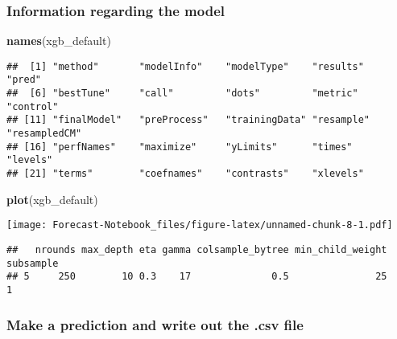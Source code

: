 \documentclass[]{article}
\newenvironment{Shaded}{\begin{snugshade}}{\end{snugshade}}
\newcommand{\KeywordTok}[1]{\textcolor[rgb]{0.13,0.29,0.53}{\textbf{#1}}}
\newcommand{\NormalTok}[1]{#1}
\newcommand{\OperatorTok}[1]{\textcolor[rgb]{0.81,0.36,0.00}{\textbf{#1}}}
\begin{document}
\hypertarget{information-regarding-the-model}{%
\subsubsection{Information regarding the
model}\label{information-regarding-the-model}}

\begin{Shaded}
\begin{Highlighting}[]
\KeywordTok{names}\NormalTok{(xgb_default)}
\end{Highlighting}
\end{Shaded}

\begin{verbatim}
##  [1] "method"       "modelInfo"    "modelType"    "results"      "pred"        
##  [6] "bestTune"     "call"         "dots"         "metric"       "control"     
## [11] "finalModel"   "preProcess"   "trainingData" "resample"     "resampledCM" 
## [16] "perfNames"    "maximize"     "yLimits"      "times"        "levels"      
## [21] "terms"        "coefnames"    "contrasts"    "xlevels"
\end{verbatim}

\begin{Shaded}
\begin{Highlighting}[]
\KeywordTok{plot}\NormalTok{(xgb_default)}
\end{Highlighting}
\end{Shaded}

\texttt{[image: Forecast-Notebook\_files/figure-latex/unnamed-chunk-8-1.pdf]}

\begin{Shaded}
\end{Shaded}

\begin{verbatim}
##   nrounds max_depth eta gamma colsample_bytree min_child_weight subsample
## 5     250        10 0.3    17              0.5               25         1
\end{verbatim}

\hypertarget{make-a-prediction-and-write-out-the-.csv-file}{%
\subsubsection{Make a prediction and write out the .csv
file}\label{make-a-prediction-and-write-out-the-.csv-file}}
\end{document}
